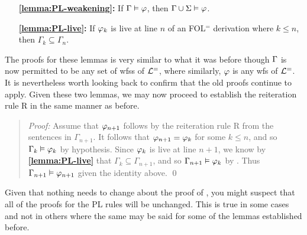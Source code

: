 \begin{itemize}[leftmargin=1.25in]
  \item[\bf \ref{lemma:PL-weakening}:] If $\Gamma \vDash \varphi$, then $\Gamma \cup \Sigma \vDash \varphi$.
  \item[\bf \ref{lemma:PL-live}:] If $\varphi_k$ is live at line $n$ of an FOL$^=$ derivation where $k\leq n$, then $\Gamma_k\subseteq \Gamma_{n}$.
\end{itemize}


The proofs for these lemmas is very similar to what it was before though $\Gamma$ is now permitted to be any set of wfss of $\mathcal{L}^{=}$, where similarly, $\varphi$ is any wfs of $\mathcal{L}^{=}$. 
It is nevertheless worth looking back to confirm that the old proofs continue to apply.
Given these two lemmas, we may now proceed to establish the reiteration rule R in the same manner as before.


\begin{quote} 
  \textit{Proof:} Assume that $\varphi_{n+1}$ follows by the reiteration rule R from the sentences in $\Gamma_{n+1}$.
  It follows that $\varphi_{n+1}=\varphi_{k}$ for some $k\leq n$, and so $\Gamma_k \vDash \varphi_k$ by hypothesis.
  Since $\varphi_k$ is live at line $n+1$, we know by \textbf{\ref{lemma:PL-live}} that $\Gamma_k\subseteq \Gamma_{n+1}$, and so $\Gamma_{n+1} \vDash \varphi_{k}$ by .
  Thus $\Gamma_{n+1} \vDash \varphi_{n+1}$ given the identity above.
  \qed
\end{quote}


Given that nothing needs to change about the proof of , you might suspect that all of the proofs for the PL rules will be unchanged.
This is true in some cases and not in others where the same may be said for some of the lemmas established before.




